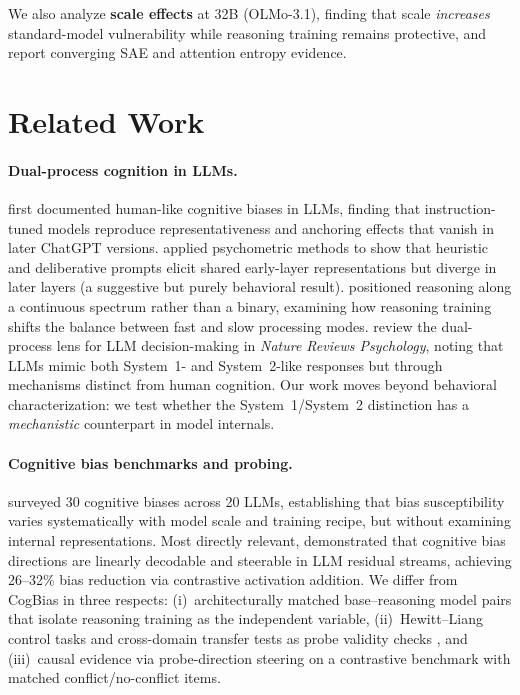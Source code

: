 \documentclass{article}
\begin{document}
\noindent We also analyze \textbf{scale effects} at 32B
(OLMo-3.1), finding that scale \emph{increases} standard-model
vulnerability while reasoning training remains protective, and report
converging SAE and attention entropy evidence.


\section{Related Work}
\label{sec:related}

\paragraph{Dual-process cognition in LLMs.}
\citet{hagendorff2023human} first documented human-like cognitive biases
in LLMs, finding that instruction-tuned models reproduce
representativeness and anchoring effects that vanish in later ChatGPT
versions.  \citet{codaforno2025dual} applied psychometric methods to show
that heuristic and deliberative prompts elicit shared early-layer
representations but diverge in later layers (a suggestive but purely
behavioral result).  \citet{ziabari2025reasoning} positioned reasoning
along a continuous spectrum rather than a binary, examining how reasoning
training shifts the balance between fast and slow processing modes.
\citet{brady2025dual} review the dual-process lens for LLM
decision-making in \emph{Nature Reviews Psychology}, noting that LLMs
mimic both System~1- and System~2-like responses but through mechanisms
distinct from human cognition.
Our work moves beyond behavioral characterization: we test whether the
System~1/System~2 distinction has a \emph{mechanistic} counterpart in
model internals.

\paragraph{Cognitive bias benchmarks and probing.}
\citet{malberg2025cognitive} surveyed 30 cognitive biases across 20 LLMs,
establishing that bias susceptibility varies systematically with model
scale and training recipe, but without examining internal representations.
Most directly relevant, \citet{huang2026cogbias} demonstrated that
cognitive bias directions are linearly decodable and steerable in LLM
residual streams, achieving 26--32\% bias reduction via contrastive
activation addition.  We differ from CogBias in three respects:
(i)~architecturally matched base--reasoning model pairs that isolate
reasoning training as the independent variable, (ii)~Hewitt--Liang
control tasks and cross-domain transfer tests as probe validity checks
\citep{hewitt2019control}, and (iii)~causal evidence via probe-direction
steering on a contrastive benchmark with matched conflict/no-conflict
items.
\end{document}
